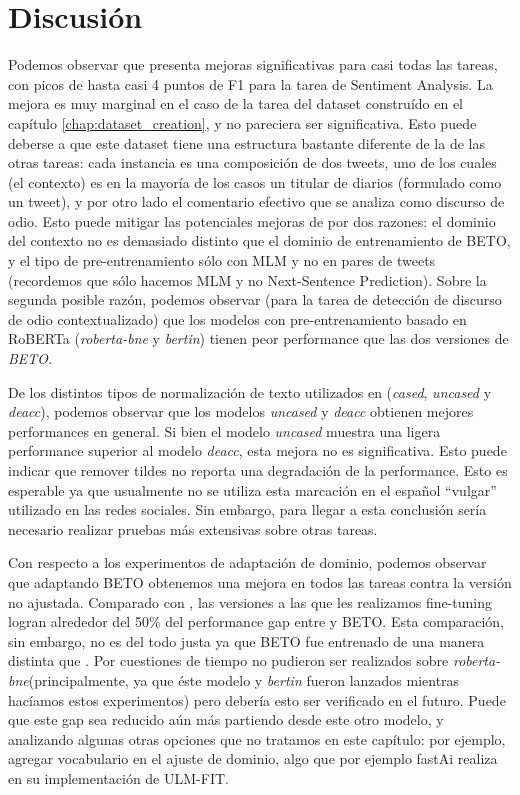\section{Discusión}

Podemos observar que \robertuito{} presenta mejoras significativas para casi todas las tareas, con picos de hasta casi 4 puntos de F1 para la tarea de Sentiment Analysis. La mejora es muy marginal en el caso de la tarea del dataset construído en el capítulo \ref{chap:dataset_creation}, y no pareciera ser significativa. Esto puede deberse a que este dataset tiene una estructura bastante diferente de la de las otras tareas: cada instancia es una composición de dos tweets, uno de los cuales (el contexto) es en la mayoría de los casos un titular de diarios (formulado como un tweet), y por otro lado el comentario efectivo que se analiza como discurso de odio. Esto puede mitigar las potenciales mejoras de \robertuito{} por dos razones: el dominio del contexto no es demasiado distinto que el dominio de entrenamiento de BETO, y el tipo de pre-entrenamiento sólo con MLM y no en pares de tweets (recordemos que sólo hacemos MLM y no Next-Sentence Prediction). Sobre la segunda posible razón, podemos observar (para la tarea de detección de discurso de odio contextualizado) que los modelos con pre-entrenamiento basado en RoBERTa (\emph{roberta-bne} y \emph{bertin}) tienen peor performance que las dos versiones de \emph{BETO}.

De los distintos tipos de normalización de texto utilizados en \robertuito{} (\emph{cased}, \emph{uncased} y \emph{deacc}), podemos observar que los modelos \emph{uncased} y \emph{deacc} obtienen mejores performances en general. Si bien el modelo \emph{uncased} muestra una ligera performance superior al modelo \emph{deacc}, esta mejora no es significativa. Esto puede indicar que remover tildes no reporta una degradación de la performance. Esto es esperable ya que usualmente no se utiliza esta marcación en el español ``vulgar'' utilizado en las redes sociales. Sin embargo, para llegar a esta conclusión sería necesario realizar pruebas más extensivas sobre otras tareas.

Con respecto a los experimentos de adaptación de dominio, podemos observar que adaptando BETO obtenemos una mejora en todos las tareas contra la versión no ajustada. Comparado con \robertuito{}, las versiones a las que les realizamos fine-tuning logran alrededor del 50\% del performance gap entre \robertuito{} y BETO. Esta comparación, sin embargo, no es del todo justa ya que BETO fue entrenado de una manera distinta que \robertuito{}. Por cuestiones de tiempo no pudieron ser realizados sobre \emph{roberta-bne}(principalmente, ya que éste modelo y \emph{bertin} fueron lanzados mientras hacíamos estos experimentos) pero debería esto ser verificado en el futuro. Puede que este gap sea reducido aún más partiendo desde este otro modelo, y analizando algunas otras opciones que no tratamos en este capítulo: por ejemplo, agregar vocabulario en el ajuste de dominio, algo que por ejemplo fastAi realiza en su implementación de ULM-FIT.

